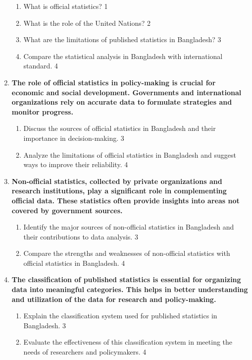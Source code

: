 \documentclass[a4paper,oneside]{book}
\begin{document}
\begin{enumerate}
  \begin{enumerate}
    \item
	What is official statistics?  \hfill 1
    \item
	What is the role of the United Nations? \hfill 2
    \item  
	What are the limitations of published statistics in Bangladesh? \hfill 3
    \item
	Compare the statistical analysis in Bangladesh with international standard. \hfill 4
  \end{enumerate}
  
  \item
\textbf{The role of official statistics in policy-making is crucial for economic and social development. Governments and international organizations rely on accurate data to formulate strategies and monitor progress.}

\begin{enumerate}
    \item  
    Discuss the sources of official statistics in Bangladesh and their importance in decision-making. \hfill 3
    \item
    Analyze the limitations of official statistics in Bangladesh and suggest ways to improve their reliability. \hfill 4
\end{enumerate}


\item
\textbf{Non-official statistics, collected by private organizations and research institutions, play a significant role in complementing official data. These statistics often provide insights into areas not covered by government sources.}

\begin{enumerate}
    \item  
    Identify the major sources of non-official statistics in Bangladesh and their contributions to data analysis. \hfill 3
    \item
    Compare the strengths and weaknesses of non-official statistics with official statistics in Bangladesh. \hfill 4
\end{enumerate}

\item
\textbf{The classification of published statistics is essential for organizing data into meaningful categories. This helps in better understanding and utilization of the data for research and policy-making.}

\begin{enumerate}
    \item  
    Explain the classification system used for published statistics in Bangladesh. \hfill 3
    \item
    Evaluate the effectiveness of this classification system in meeting the needs of researchers and policymakers. \hfill 4
\end{enumerate}

 \end{enumerate}
 
\end{document}
